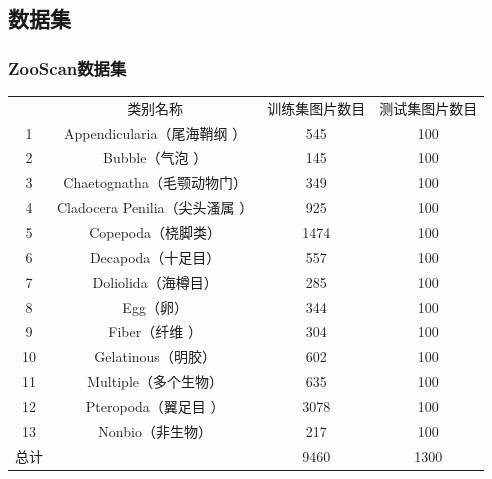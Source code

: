 \documentclass[notheorems,mathserif,table,compress]{beamer}  %
\begin{document}
\subsection{数据集}
\begin{frame}
\frametitle{ZooScan数据集}
\centering
\begin{table}
\small
{}
\begin{tabular}[c]{c|c|c|c}
 & 类别名称 & 训练集图片数目 & 测试集图片数目\\
1 & Appendicularia（尾海鞘纲 ）& 545 & 100 \\
2 & Bubble（气泡 ）& 145 & 100\\ 
3 & Chaetognatha（毛颚动物门） & 349 & 100\\
4 & Cladocera Penilia（尖头溞属 ）& 925 & 100\\
5 & Copepoda（桡脚类） & 1474 & 100\\
6 & Decapoda（十足目） & 557 & 100\\
7 & Doliolida（海樽目） & 285 & 100\\
8 & Egg（卵） & 344 & 100\\
9 & Fiber（纤维 ）& 304 & 100\\
10 & Gelatinous（明胶）& 602 & 100\\
11 & Multiple（多个生物）& 635 & 100\\
12 & Pteropoda（翼足目 ）& 3078 & 100\\
13 & Nonbio（非生物）& 217 & 100\\
总计 &  & {\color{red}9460} & {\color{red}1300}\\
\end{tabular}
\end{table}
\end{frame}
\end{document}

